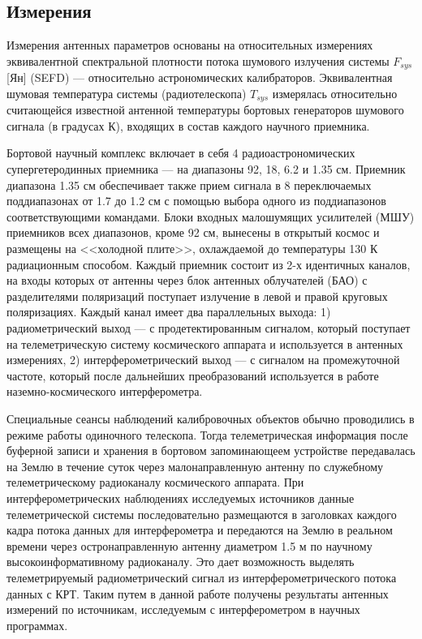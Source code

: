 \subsection{Измерения}

Измерения антенных параметров основаны на относительных измерениях эквивалентной спектральной
плотности потока шумового излучения системы $F_{sys}$ [Ян] (SEFD) --- относительно астрономических
калибраторов. Эквивалентная шумовая температура системы (радиотелескопа) $T_{sys}$ измерялась
относительно считающейся известной антенной температуры бортовых генераторов шумового сигнала (в
градусах К), входящих в состав каждого научного приемника.

Бортовой научный комплекс включает в себя 4 радиоастрономических супергетеродинных приемника --- на
диапазоны 92, 18, 6.2 и 1.35 см. Приемник диапазона 1.35 см обеспечивает также прием сигнала в 8
переключаемых поддиапазонах от 1.7 до 1.2 см с помощью выбора одного из поддиапазонов
соответствующими командами. Блоки входных малошумящих усилителей (МШУ) приемников всех диапазонов,
кроме 92 см, вынесены в открытый космос и размещены на <<холодной плите>>, охлаждаемой до
температуры 130 К радиационным способом. Каждый приемник состоит из 2-х идентичных каналов, на входы
которых от антенны через блок антенных облучателей (БАО) с разделителями поляризаций поступает
излучение в левой и правой круговых поляризациях. Каждый канал имеет два параллельных выхода: 1)
радиометрический выход --- с продетектированным сигналом, который поступает на телеметрическую
систему космического аппарата и используется в антенных измерениях, 2) интерферометрический выход
--- с сигналом на промежуточной частоте, который после дальнейших преобразований используется в
работе наземно-космического интерферометра.

Специальные сеансы наблюдений калибровочных объектов обычно проводились в режиме работы одиночного
телескопа. Тогда телеметрическая информация после буферной записи и хранения в бортовом
запоминающеем устройстве передавалась на Землю в течение суток через малонаправленную антенну по
служебному телеметрическому радиоканалу космического аппарата. При интерферометрических наблюдениях
исследуемых источников данные телеметрической системы последовательно размещаются в заголовках
каждого кадра потока данных для интерферометра и передаются на Землю в реальном времени через
остронаправленную антенну диаметром 1.5 м по научному высокоинформативному радиоканалу. Это дает
возможность выделять телеметрируемый радиометрический сигнал из интерферометрического потока данных
с КРТ. Таким путем в данной работе получены результаты антенных измерений по источникам, исследуемым
с интерферометром в научных программах.


